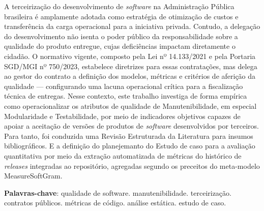 \begin{resumo}
A terceirização do desenvolvimento de \textit{software} na Administração Pública brasileira é amplamente adotada como estratégia de otimização de custos e transferência da carga operacional para a iniciativa privada. Contudo, a delegação do desenvolvimento não isenta o poder público da responsabilidade sobre a qualidade do produto entregue, cujas deficiências impactam diretamente o cidadão. O normativo vigente, composto pela Lei nº 14.133/2021 e pela Portaria SGD/MGI nº 750/2023, estabelece diretrizes para essas contratações, mas delega ao gestor do contrato a definição dos modelos, métricas e critérios de aferição da qualidade — configurando uma lacuna operacional crítica para a fiscalização técnica de entregas. Nesse contexto, este trabalho investiga de forma empírica como operacionalizar os atributos de qualidade de Manutenibilidade, em especial Modularidade e Testabilidade, por meio de indicadores objetivos capazes de apoiar a aceitação de versões de produtos de \textit{software} desenvolvidos por terceiros. Para tanto, foi conduzida uma Revisão Estruturada da Literatura para insumos bibliográficos. E a definição do planejemanto do Estudo de caso para a avaliação quantitativa  por meio da extração automatizada de métricas do histórico de \textit{releases} integradas ao repositório, agregadas segundo os preceitos do meta-modelo MeasureSoftGram.

 \vspace{\onelineskip}

 \noindent
 \textbf{Palavras-chave}: qualidade de software. manutenibilidade. terceirização. contratos públicos. métricas de código. análise estática. estudo de caso.
\end{resumo}

